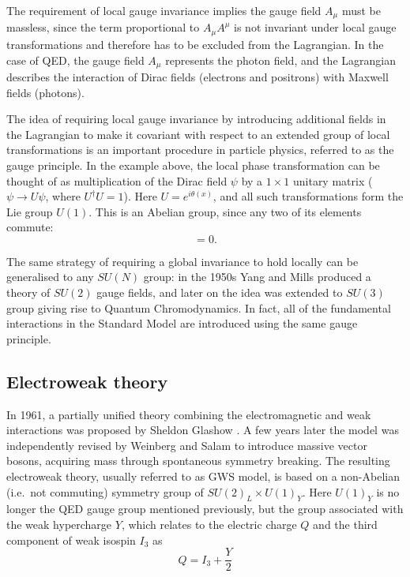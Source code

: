 The requirement of local gauge invariance implies the gauge field $A_\mu$ must be massless, since the term proportional
to $A_\mu A^\mu$ is not invariant under local gauge transformations and therefore has to be excluded from the
Lagrangian. In the case of QED, the gauge field $A_\mu$ represents the photon field, and the Lagrangian describes the
interaction of Dirac fields (electrons and positrons) with Maxwell fields (photons).

The idea of requiring local gauge invariance by introducing additional fields in the Lagrangian to make it covariant
with respect to an extended group of local transformations is an important procedure in particle physics, referred to as
the gauge principle. In the example above, the local phase transformation can be thought of as multiplication of the
Dirac field $\psi$ by a $1 \times 1$ unitary matrix ($\psi \rightarrow U \psi$, where $U^{\dag}U = 1$). Here $U = e^{i
\theta(x)}$, and all such transformations form the Lie group $U(1)$. This is an Abelian group, since any two of its
elements commute:
\begin{equation}
[e^{i \theta(x)},~e^{i\theta(x')}] = 0.
\end{equation}

The same strategy of requiring a global invariance to hold locally can be generalised to any $SU(N)$ group: in the 1950s
Yang and Mills \autocite{Yang_Mills} produced a theory of $SU(2)$ gauge fields, and later on the idea was extended to
$SU(3)$ group giving rise to Quantum Chromodynamics. In fact, all of the fundamental interactions in the Standard Model
are introduced using the same gauge principle.

\newpage
\subsection{Electroweak theory}
\label{ss:electroweak_theory}
In 1961, a partially unified theory combining the electromagnetic and weak interactions was proposed by Sheldon Glashow
\autocite{Glashow}. A few years later the model was independently revised by Weinberg \autocite{Weinberg} and Salam
\autocite{Salam} to introduce massive vector bosons, acquiring mass through spontaneous symmetry breaking. The resulting
electroweak theory, usually referred to as GWS model, is based on a non-Abelian (i.e.\ not commuting) symmetry group of
$SU(2)_L \times U(1)_Y$. Here $U(1)_Y$ is no longer the QED gauge group mentioned previously, but the group associated
with the weak hypercharge $Y$, which relates to the electric charge $Q$ and the third component of weak isospin $I_3$ as
\begin{equation}
Q = I_3 + \frac{Y}{2} 
\end{equation} 


